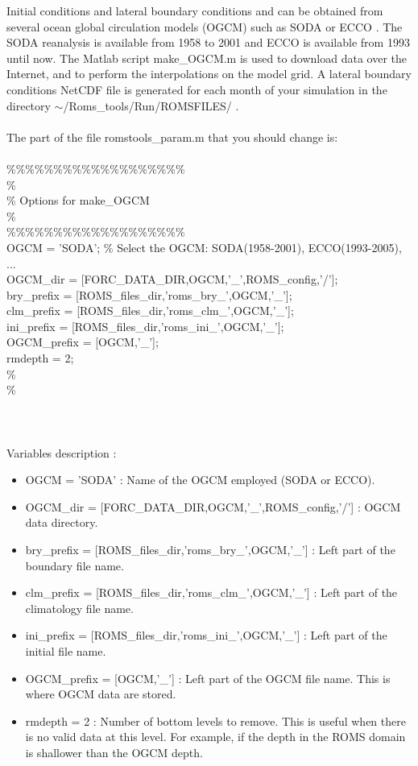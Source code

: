 Initial conditions and lateral boundary conditions and  can be 
obtained from several ocean global circulation models (OGCM) 
such as SODA \citep{Car05} or ECCO \citep{Sta99}. The SODA 
reanalysis is available from 1958 to 2001 and ECCO is available 
from 1993 until now. The Matlab script make\_OGCM.m is used to 
download data over the Internet, and to perform the interpolations 
on the model grid. 
A lateral boundary conditions NetCDF file is generated for each month 
of your simulation in the directory $\sim$/Roms\_tools/Run/ROMSFILES/ . 
\\
\\
The part of the file romstools\_param.m that you should change is:
\\
\\
\%\%\%\%\%\%\%\%\%\%\%\%\%\%\%\%\%\%\%\\
\%\\
\% Options for make\_OGCM \\
\%\\
\%\%\%\%\%\%\%\%\%\%\%\%\%\%\%\%\%\%\%\\
OGCM        = 'SODA';                                \% Select the OGCM:
SODA(1958-2001), ECCO(1993-2005), ...\\
OGCM\_dir    = [FORC\_DATA\_DIR,OGCM,'\_',ROMS\_config,'/'];  \\
bry\_prefix  = [ROMS\_files\_dir,'roms\_bry\_',OGCM,'\_']; \\
clm\_prefix  = [ROMS\_files\_dir,'roms\_clm\_',OGCM,'\_']; \\
ini\_prefix  = [ROMS\_files\_dir,'roms\_ini\_',OGCM,'\_']; \\
OGCM\_prefix = [OGCM,'\_'];                            \\
rmdepth     = 2;                                    \\ 
\%                             \\
\%                        \\
\\\\\\
Variables description :
\begin{itemize}
\item OGCM = 'SODA' : Name of the OGCM employed (SODA or ECCO).
\item OGCM\_dir    = [FORC\_DATA\_DIR,OGCM,'\_',ROMS\_config,'/']  : 
OGCM data directory.
\item bry\_prefix  = [ROMS\_files\_dir,'roms\_bry\_',OGCM,'\_'] : 
Left part of the boundary file name.
\item clm\_prefix  = [ROMS\_files\_dir,'roms\_clm\_',OGCM,'\_'] : 
Left part of the climatology file name.
\item ini\_prefix  = [ROMS\_files\_dir,'roms\_ini\_',OGCM,'\_'] : 
Left part of the initial file name.
\item OGCM\_prefix = [OGCM,'\_'] : 
Left part of the OGCM file name. This is where OGCM data are
stored. 
\item rmdepth = 2 : Number of bottom levels to remove.
This is useful when there is no valid data at this level.
For example, if the depth in the ROMS domain is shallower 
than the OGCM depth.
\end{itemize}
